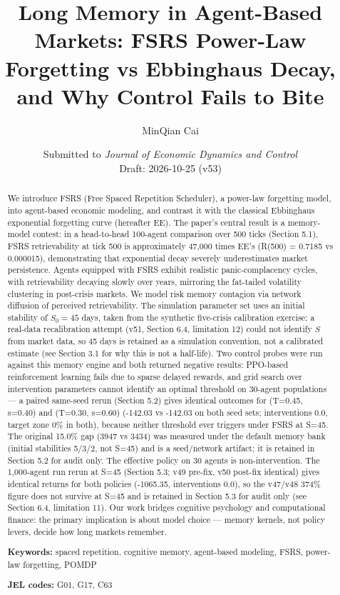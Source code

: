 \documentclass[11pt]{article}
\title{Long Memory in Agent-Based Markets: FSRS Power-Law Forgetting vs Ebbinghaus Decay, and Why Control Fails to Bite}
\author{MinQian Cai}
\date{Submitted to \textit{Journal of Economic Dynamics and Control}\\Draft: 2026-10-25 (v53)}
\begin{document}
\maketitle

\begin{abstract}
We introduce FSRS (Free Spaced Repetition Scheduler), a power-law forgetting model, into agent-based economic modeling, and contrast it with the classical Ebbinghaus exponential forgetting curve (hereafter EE). The paper's central result is a memory-model contest: in a head-to-head 100-agent comparison over 500 ticks (Section 5.1), FSRS retrievability at tick 500 is approximately 47,000 times EE's (R(500) = 0.7185 vs 0.000015), demonstrating that exponential decay severely underestimates market persistence. Agents equipped with FSRS exhibit realistic panic-complacency cycles, with retrievability decaying slowly over years, mirroring the fat-tailed volatility clustering in post-crisis markets. We model risk memory contagion via network diffusion of perceived retrievability. The simulation parameter set uses an initial stability of $S_0 = 45$ days, taken from the synthetic five-crisis calibration exercise; a real-data recalibration attempt (v51, Section 6.4, limitation 12) could not identify $S$ from market data, so 45 days is retained as a simulation convention, not a calibrated estimate (see Section 3.1 for why this is not a half-life). Two control probes were run against this memory engine and both returned negative results: PPO-based reinforcement learning fails due to sparse delayed rewards, and grid search over intervention parameters cannot identify an optimal threshold on 30-agent populations --- a paired same-seed rerun (Section 5.2) gives identical outcomes for (T=0.45, s=0.40) and (T=0.30, s=0.60) (-142.03 vs -142.03 on both seed sets; interventions 0.0, target zone 0\% in both), because neither threshold ever triggers under FSRS at S=45. The original 15.0\% gap (3947 vs 3434) was measured under the default memory bank (initial stabilities 5/3/2, not S=45) and is a seed/network artifact; it is retained in Section 5.2 for audit only. The effective policy on 30 agents is non-intervention. The 1,000-agent run rerun at S=45 (Section 5.3; v49 pre-fix, v50 post-fix identical) gives identical returns for both policies (-1065.35, interventions 0.0), so the v47/v48 374\% figure does not survive at S=45 and is retained in Section 5.3 for audit only (see Section 6.4, limitation 11). Our work bridges cognitive psychology and computational finance: the primary implication is about model choice --- memory kernels, not policy levers, decide how long markets remember.

\textbf{Keywords:} spaced repetition, cognitive memory, agent-based modeling, FSRS, power-law forgetting, POMDP

\textbf{JEL codes:} G01, G17, C63

\end{abstract}
\end{document}
